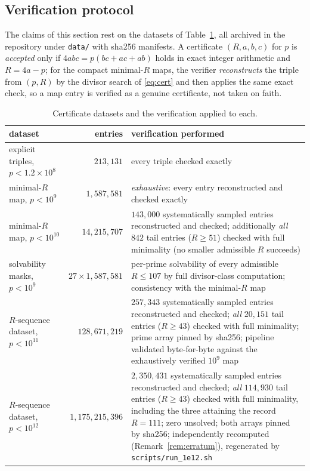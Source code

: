 \documentclass[11pt]{article}
\theoremstyle{plain}
\theoremstyle{remark}
\theoremstyle{plain}
\numberwithin{equation}{section}
\begin{document}
\subsection{Verification protocol}\label{sec:protocol}

The claims of this section rest on the datasets of
Table~\ref{tab:datasets}, all archived in the repository under
\texttt{data/} with sha256 manifests. A
certificate $(R, a, b, c)$ for $p$ is \emph{accepted} only if
$4abc = p(bc + ac + ab)$ holds in exact integer arithmetic and
$R = 4a - p$; for the compact minimal-$R$ maps, the verifier
\emph{reconstructs} the triple from $(p, R)$ by the divisor search of
\eqref{eq:cert} and then applies the same exact check, so a map entry is
verified as a genuine certificate, not taken on faith.

\begin{table}[htbp]
\centering
\small
\begin{tabular}{>{\raggedright\arraybackslash}p{3.4cm}r>{\raggedright\arraybackslash}p{6.6cm}}
\toprule
dataset & entries & verification performed \\ \midrule
explicit triples, $p < 1.2 \times 10^8$ &
$213{,}131$ &
every triple checked exactly \\ \addlinespace
minimal-$R$ map, $p < 10^9$ &
$1{,}587{,}581$ &
\emph{exhaustive}: every entry reconstructed and checked exactly \\ \addlinespace
minimal-$R$ map, $p < 10^{10}$ &
$14{,}215{,}707$ &
$143{,}000$ systematically sampled entries reconstructed and checked;
additionally \emph{all} $842$ tail entries ($R \ge 51$) checked with full
minimality (no smaller admissible $R$ succeeds) \\ \addlinespace
solvability masks, $p < 10^9$ &
$27 \times 1{,}587{,}581$ &
per-prime solvability of every admissible $R \le 107$ by full divisor-class
computation; consistency with the minimal-$R$ map \\ \addlinespace
$R$-sequence dataset, $p < 10^{11}$ &
$128{,}671{,}219$ &
$257{,}343$ systematically sampled entries reconstructed and checked;
\emph{all} $20{,}151$ tail entries ($R \ge 43$) checked with full
minimality; prime array pinned by sha256; pipeline validated
byte-for-byte against the exhaustively verified $10^9$ map \\ \addlinespace
$R$-sequence dataset, $p < 10^{12}$ &
$1{,}175{,}215{,}396$ &
$2{,}350{,}431$ systematically sampled entries reconstructed and
checked; \emph{all} $114{,}930$ tail entries ($R \ge 43$) checked
with full minimality, including the three attaining the record
$R = 111$; zero unsolved; both arrays pinned by sha256; independently
recomputed (Remark~\ref{rem:erratum}), regenerated by
\texttt{scripts/run\_1e12.sh} \\
\bottomrule
\end{tabular}
\caption{Certificate datasets and the verification applied to each.}
\label{tab:datasets}
\end{table}
\end{document}
